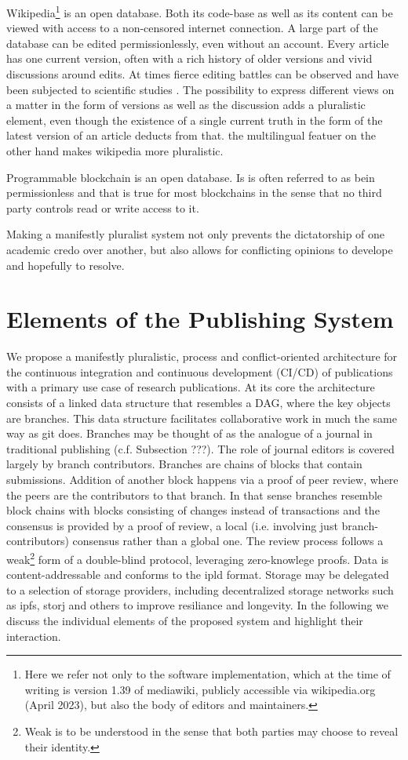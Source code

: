 \documentclass[14pt]{article}
\begin{document}
Wikipedia\footnote{Here we refer not only to the software implementation, which at the time of writing is version 1.39 of mediawiki, publicly accessible via wikipedia.org (April 2023), but also the body of editors and maintainers.} is an open database. Both its code-base as well as its content can be viewed with access to a non-censored internet connection. A large part of the database can be edited permissionlessly, even without an account. Every article has one current version, often with a rich history of older versions and vivid discussions around edits. At times fierce editing battles can be observed and have been subjected to scientific studies \cite{dedeo}. 
The possibility to express different views on a matter in the form of versions as well as the discussion adds a pluralistic element, even though the existence of a single current truth in the form of the latest version of an article deducts from that. the multilingual featuer on the other hand makes wikipedia more pluralistic. 

Programmable blockchain is an open database. Is is often referred to as bein permissionless and that is true for most blockchains in the sense that no third party controls read or write access to it.


 Making a manifestly pluralist system not only prevents the dictatorship of one academic credo over another, but also allows for conflicting opinions to develope and hopefully to resolve.
 

\section{Elements of the Publishing System}

We propose a manifestly pluralistic, process and conflict-oriented architecture for the continuous integration and continuous development (CI/CD) of publications with a primary use case of research publications. At its core the architecture consists of a linked data structure that resembles a DAG, where the key objects are branches. This data structure facilitates collaborative work in much the same way as git does. Branches may be thought of as the analogue of a journal in traditional publishing (c.f. Subsection ???). The role of journal editors is covered largely by branch contributors. Branches are chains of blocks that contain submissions. Addition of another block happens via a proof of peer review, where the peers are the contributors to that branch. In that sense branches resemble block chains with blocks consisting of changes instead of transactions and the consensus is provided by a  proof of review, a local (i.e. involving just branch-contributors) consensus rather than a global one.
The review process follows a weak\footnote{Weak is to be understood in the sense that both parties may choose to reveal their identity.} form of a double-blind protocol, leveraging zero-knowlege proofs.
Data is content-addressable and conforms to the ipld format. Storage may be delegated to a selection of storage providers, including decentralized storage networks such as ipfs, storj and others to improve resiliance and longevity. In the following we discuss the individual elements of the proposed system and highlight their interaction.
\end{document}
